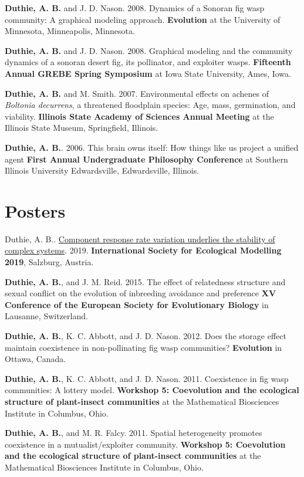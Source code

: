 \documentclass[letterpaper]{article}
\renewenvironment{itemize}{
  \begin{list}{}{
    \setlength{\leftmargin}{1.5em}
  }
}{
  \end{list}
}
\begin{document}
\begin{itemize}
\item {\bf Duthie, A. B.} and J. D. Nason. 2008. Dynamics of a Sonoran fig wasp community: A graphical modeling approach. {\bf Evolution} at the University of Minnesota, Minneapolis, Minnesota.
\item {\bf Duthie, A. B.} and J. D. Nason. 2008. Graphical modeling and the community dynamics of a sonoran desert fig, its pollinator, and exploiter wasps. {\bf Fifteenth Annual GREBE Spring Symposium} at Iowa State University, Ames, Iowa.
\item {\bf Duthie, A. B.} and M. Smith. 2007. Environmental effects on achenes of {\it Boltonia decurrens}, a threatened floodplain species: Age, mass, germination, and viability. {\bf Illinois State Academy of Sciences Annual Meeting} at the Illinois State Museum, Springfield, Illinois.
\item {\bf Duthie, A. B.}. 2006. This brain owns itself: How things like us project a unified agent {\bf First Annual Undergraduate Philosophy Conference} at Southern Illinois University Edwardsville, Edwardsville, Illinois.
\end{itemize}

\section*{Posters}
\begin{itemize}
\item {\bd Duthie, A. B.}. \href{http://bradduthie.github.io/posters/duthie_ISEM_2019.pdf}{Component response rate variation underlies the stability of complex systems}. 2019. {\bf International Society for Ecological Modelling 2019}, Salzburg, Austria.
\item {\bf Duthie, A. B.}, and J. M. Reid. 2015. The effect of relatedness structure and sexual conflict on the evolution of inbreeding avoidance and preference {\bf XV Conference of the European Society for Evolutionary Biology} in Lausanne, Switzerland.
\item {\bf Duthie, A. B.}, K. C. Abbott, and J. D. Nason. 2012. Does the storage effect maintain coexistence in non-pollinating fig wasp communities? {\bf Evolution} in Ottawa, Canada.
\item {\bf Duthie, A. B.}, K. C. Abbott, and J. D. Nason. 2011. Coexistence in fig wasp communities: A lottery model. {\bf Workshop 5: Coevolution and the ecological structure of plant-insect communities} at the Mathematical Biosciences Institute in Columbus, Ohio.
\item {\bf Duthie, A. B.}, and M. R. Falcy. 2011. Spatial heterogeneity promotes coexistence in a mutualist/exploiter community. {\bf Workshop 5: Coevolution and the ecological structure of plant-insect communities} at the Mathematical Biosciences Institute in Columbus, Ohio.
\end{itemize}
\end{document}
